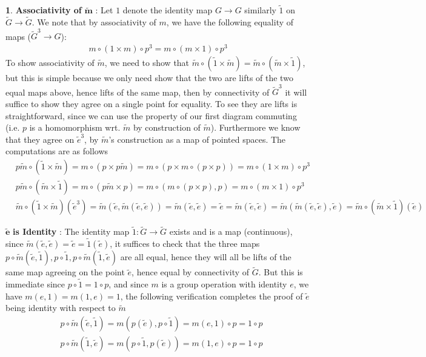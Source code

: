 \documentclass[10.5pt]{article}
\theoremstyle{definition}
\newtheorem{pb}{}
\begin{document}
\begin{pb}
        \textbf{Associativity of} \(\mathbf{\tilde{m}}\) : Let \(1\) denote the identity map \(G \to G\) similarly \(\tilde{1}\) on \(\tilde{G} \to \tilde{G}\). We note that by associativity of \(m\), we have the following equality of maps (\(\tilde{G}^3 \to G\)):
        \begin{align*}
            m \circ (1 \times m) \circ p^3 = m \circ (m \times 1) \circ p^3
        \end{align*}
        To show associativity of \(\tilde{m}\), we need to show that \(\tilde{m} \circ (\tilde{1} \times \tilde{m}) = \tilde{m} \circ (\tilde{m} \times \tilde{1})\), but this is simple because we only need show that the two are lifts of the two equal maps above, hence lifts of the same map, then by connectivity of \(\tilde{G}^3\) it will suffice to show they agree on a single point for equality. To see they are lifts is straightforward, since we can use the property of our first diagram commuting (i.e. \(p\) is a homomorphism wrt. \(\tilde{m}\) by construction of \(\tilde{m}\)). Furthermore we know that they agree on \(\tilde{e}^3\), by \(\tilde{m}\)'s construction as a map of pointed spaces. The computations are as follows
        \begin{align*}
            &p\tilde{m} \circ (\tilde{1} \times \tilde{m}) = m \circ (p \times p\tilde{m})
            = m \circ (p \times m\circ(p \times p)) = m \circ (1 \times m) \circ p^3 \\
            &p\tilde{m} \circ (\tilde{m} \times \tilde{1}) = m \circ(p\tilde{m}\times p) = m \circ (m \circ (p \times p),p) = m \circ (m \times 1) \circ p^3\\
            &\tilde{m} \circ (\tilde{1} \times \tilde{m})(\tilde{e}^3) = \tilde{m}(\tilde{e},\tilde{m}(\tilde{e},\tilde{e})) = \tilde{m}(\tilde{e},\tilde{e}) = \tilde{e} = \tilde{m}(\tilde{e},\tilde{e}) = \tilde{m}(\tilde{m}(\tilde{e},\tilde{e}),\tilde{e}) = \tilde{m}\circ(\tilde{m} \times \tilde{1})(\tilde{e})
        \end{align*}
        
        \(\mathbf{\tilde{e}}\) \textbf{is Identity} : The identity map \(\tilde{1}: \tilde{G} \to \tilde{G}\) exists and is a map (continuous), since \(\tilde{m}(\tilde{e},\tilde{e}) = \tilde{e} = \tilde{1}(\tilde{e})\), it suffices to check that the three maps \(p\circ\tilde{m}(\tilde{e},\tilde{1}), p\circ\tilde{1}, p\circ\tilde{m}(\tilde{1},\tilde{e})\) are all equal, hence they will all be lifts of the same map agreeing on the point \(\tilde{e}\), hence equal by connectivity of \(\tilde{G}\). But this is immediate since \(p\circ\tilde{1} = 1\circ p\), and since \(m\) is a group operation with identity \(e\), we have \(m(e,1) = m(1,e) = 1\), the following verification completes the proof of \(\tilde{e}\) being identity with respect to \(\tilde{m}\)
        \begin{align*}
            &p\circ\tilde{m}(\tilde{e},\tilde{1}) = m(p(\tilde{e}),p\circ \tilde{1}) = m(e,1)\circ p = 1 \circ p \\
            &p\circ\tilde{m}(\tilde{1},\tilde{e}) = m(p\circ \tilde{1},p(\tilde{e})) = m(1,e)\circ p = 1 \circ p
        \end{align*}


\end{pb}
\end{document}
